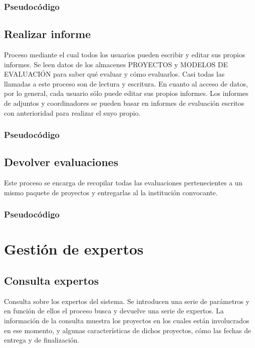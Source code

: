 \documentclass[12pt,a4paper,titlepage,spanish,twoside]{book}
\begin{document}
\subsubsection{Pseudocódigo}


\subsection{Realizar informe}
Proceso mediante el cual todos los usuarios pueden escribir y editar sus propios
informes. Se leen datos de los almacenes PROYECTOS y MODELOS DE EVALUACIÓN para 
saber qué evaluar y cómo evaluarlos. Casi todas las llamadas a este proceso son 
de lectura y escritura. En cuanto al acceso de datos, por lo general, cada 
usuario sólo puede editar sus propios informes. Los informes de adjuntos y 
coordinadores se pueden basar en informes de evaluación escritos con 
anterioridad para realizar el suyo propio.

\subsubsection{Pseudocódigo}


\subsection{Devolver evaluaciones}
Este proceso se encarga de recopilar todas las evaluaciones pertenecientes a un 
mismo paquete de proyectos y entregarlas al la institución convocante.

\subsubsection{Pseudocódigo}


\section{Gestión de expertos}

\subsection{Consulta expertos}
Consulta sobre los expertos del sistema. Se introducen una serie de
pa\-rá\-me\-tros y
en función de ellos el proceso busca y devuelve una serie de expertos. La 
información de la consulta muestra los proyectos en los cuales están 
involucrados en ese momento, y algunas características de dichos proyectos, cómo
las fechas de entrega y de finalización.
\end{document}
